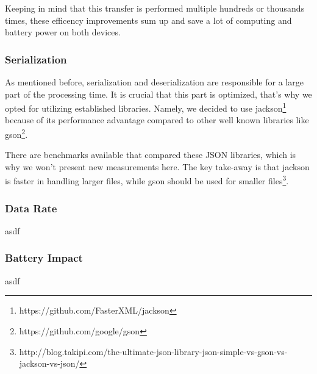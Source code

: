 Keeping in mind that this transfer is performed multiple hundreds or thousands times, these efficency improvements sum up and save a lot of computing and battery power on both devices.

\subsubsection{Serialization}
As mentioned before, serialization and deserialization are responsible for a large part of the processing time.
It is crucial that this part is optimized, that's why we opted for utilizing established libraries.
Namely, we decided to use jackson\footnote{https://github.com/FasterXML/jackson} because of its performance advantage compared to other well known libraries like gson\footnote{https://github.com/google/gson}.

There are benchmarks available that compared these JSON libraries, which is why we won't present new measurements here.
The key take-away is that jackson is faster in handling larger files, while gson should be used for smaller files\footnote{http://blog.takipi.com/the-ultimate-json-library-json-simple-vs-gson-vs-jackson-vs-json/}.

\subsubsection{Data Rate}
asdf

\subsubsection{Battery Impact}
asdf

\clearpage